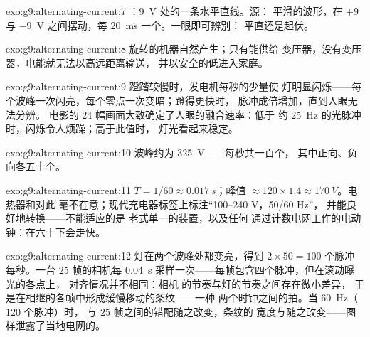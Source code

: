 \begin{solution}{exo:g9:alternating-current:7}
：\qty{9}{V} 处的一条水平直线。源：
平滑的波形，在 $+9$ 与
\qty{-9}{V} 之间摆动，每 \qty{20}{ms} 一个。一眼即可辨别：
平直还是起伏。
\end{solution}

\begin{solution}{exo:g9:alternating-current:8}
旋转的机器自然产生；只有能供给
变压器，没有变压器，电能就无法以高远距离输送，
并以安全的低进入家庭。
\end{solution}

\begin{solution}{exo:g9:alternating-current:9}
蹬踏较慢时，发电机每秒的少量使
灯明显闪烁——每个波峰一次闪亮，每个零点一次变暗；蹬得更快时，
脉冲成倍增加，直到人眼无法分辨。
电影的 $24$ 幅画面大致确定了人眼的融合速率：低于
约 \qty{25}{Hz} 的光脉冲时，闪烁令人烦躁；高于此值时，
灯光看起来稳定。
\end{solution}

\begin{solution}{exo:g9:alternating-current:10}
波峰约为 \qty{325}{V}——每秒共一百个，
其中正向、负向各五十个。
\end{solution}

\begin{solution}{exo:g9:alternating-current:11}
$T = 1/60 \approx \qty{0.017}{s}$；峰值 $\approx 120 \times
1.4 \approx \qty{170}{V}$。电热器和对此
毫不在意；现代充电器标签上标注“100--240 V，50/60 Hz”，
并能良好地转换——不能适应的是
老式单一的装置，以及任何
通过计数电网工作的电动钟：在六十下会走快。
\end{solution}

\begin{solution}{exo:g9:alternating-current:12}
灯在两个波峰处都变亮，得到 $2 \times 50 = 100$ 个脉冲
每秒。一台 $25$ 帧的相机每
\qty{0.04}{s} 采样一次——每帧包含四个脉冲，但在滚动曝光的各点上，
对齐情况并不相同：相机
的节奏与灯的节奏之间存在微小差异，
于是在相继的各帧中形成缓慢移动的条纹——一种
两个时钟之间的拍。当 \qty{60}{Hz}（$120$ 个脉冲）时，
与 $25$ 帧之间的错配随之改变，条纹的
宽度与随之改变——图样泄露了当地电网的。
\end{solution}


